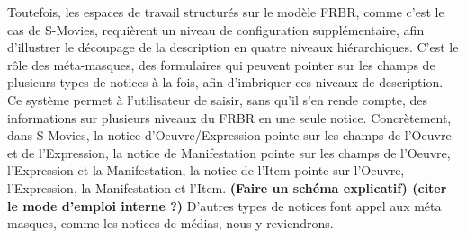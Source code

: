 Toutefois, les espaces de travail structurés sur le modèle FRBR, comme c'est le cas de S-Movies, requièrent un niveau de configuration supplémentaire, afin d'illustrer le découpage de la description en quatre niveaux hiérarchiques. C'est le rôle des méta-masques, des formulaires qui peuvent pointer sur les champs de plusieurs types de notices à la fois, afin d'imbriquer ces niveaux de description. Ce système permet à l'utilisateur de saisir, sans qu'il s'en rende compte, des informations sur plusieurs niveaux du FRBR en une seule notice. Concrètement, dans S-Movies, la notice d'Oeuvre/Expression pointe sur les champs de l'Oeuvre et de l'Expression, la notice de Manifestation pointe sur les champs de l'Oeuvre, l'Expression et la Manifestation, la notice de l'Item pointe sur l'Oeuvre, l'Expression, la Manifestation et l'Item. \textbf{(Faire un schéma explicatif) (citer le mode d'emploi interne ?)}
D'autres types de notices font appel aux méta masques, comme les notices de médias, nous y reviendrons. 

